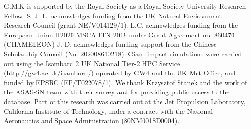 \documentclass[sn-nature]{sn-jnl}%
\begin{document}







G.M.K is supported by the Royal Society as a Royal Society University Research Fellow.
%
S. J. L. acknowledges funding from the UK Natural Environment Research Council (grant NE/V014129/1).
%
L.C. acknowledges funding from the European Union H2020-MSCA-ITN-2019 under Grant Agreement no. 860470 (CHAMELEON)
%
J. D. acknowledges funding support from the Chinese Scholarship Council (No. 202008610218). Giant impact simulations were carried out using the Isambard 2 UK National Tier-2 HPC Service (http://gw4.ac.uk/isambard/) operated by GW4 and the UK Met Office, and funded by EPSRC (EP/T022078/1).
%
We thank Krzysztof Stanek and the work of the ASAS-SN team with their survey and for providing public access to the database.
%
Part of this research was carried out at the Jet Propulsion Laboratory, California Institute of Technology, under a contract with the National Aeronautics and Space Administration (80NM0018D0004).
\end{document}
